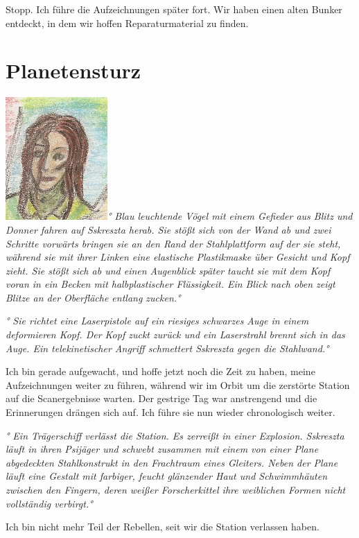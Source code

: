 \documentclass[11pt]{scrartcl}
\begin{document}
Stopp. Ich führe die Aufzeichnungen später fort. Wir haben einen alten
Bunker entdeckt, in dem wir hoffen Reparaturmaterial zu finden.

\section{Planetensturz}

\includegraphics{sskreszta-portrait-alt-klein.png}\emph{° Blau
leuchtende Vögel mit einem Gefieder aus Blitz und Donner fahren auf
Sskreszta herab. Sie stößt sich von der Wand ab und zwei Schritte
vorwärts bringen sie an den Rand der Stahlplattform auf der sie steht,
während sie mit ihrer Linken eine elastische Plastikmaske über Gesicht
und Kopf zieht. Sie stößt sich ab und einen Augenblick später taucht sie
mit dem Kopf voran in ein Becken mit halbplastischer Flüssigkeit. Ein
Blick nach oben zeigt Blitze an der Oberfläche entlang zucken.°}

\emph{° Sie richtet eine Laserpistole auf ein riesiges schwarzes Auge in
einem deformieren Kopf. Der Kopf zuckt zurück und ein Laserstrahl brennt
sich in das Auge. Ein telekinetischer Angriff schmettert Sskreszta gegen
die Stahlwand.°}

Ich bin gerade aufgewacht, und hoffe jetzt noch die Zeit zu haben, meine
Aufzeichnungen weiter zu führen, während wir im Orbit um die zerstörte
Station auf die Scanergebnisse warten. Der gestrige Tag war anstrengend
und die Erinnerungen drängen sich auf. Ich führe sie nun wieder
chronologisch weiter.

\emph{° Ein Trägerschiff verlässt die Station. Es zerreißt in einer
Explosion. Sskreszta läuft in ihren Psijäger und schwebt zusammen mit
einem von einer Plane abgedeckten Stahlkonstrukt in den Frachtraum eines
Gleiters. Neben der Plane läuft eine Gestalt mit farbiger, feucht
glänzender Haut und Schwimmhäuten zwischen den Fingern, deren weißer
Forscherkittel ihre weiblichen Formen nicht vollständig verbirgt.°}

Ich bin nicht mehr Teil der Rebellen, seit wir die Station verlassen
haben.
\end{document}

